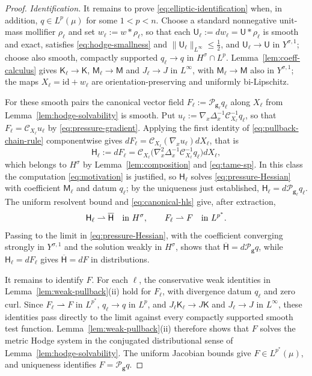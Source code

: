 \documentclass[11pt,reqno]{amsart}
\theoremstyle{plain}
\theoremstyle{definition}
\theoremstyle{remark}
\numberwithin{equation}{section}
\newcommand{\Ufield}{\mathsf U}
\newcommand{\Kmat}{\mathsf K}
\newcommand{\Mmat}{\mathsf M}
\newcommand{\Hess}{\mathsf H}     %
\newcommand{\gmetric}{\mathbf g}
\begin{document}
\begin{proof}
\emph{Identification.}
It remains to prove \eqref{eq:elliptic-identification} when, in addition,
$q\in L^p(\mu)$ for some $1<p<n$. Choose a standard nonnegative unit-mass
mollifier $\rho_\ell$ and set
$w_\ell:=w*\rho_\ell$, so that each $\Ufield_\ell:=dw_\ell=\Ufield*\rho_\ell$
is smooth and exact, satisfies \eqref{eq:hodge-smallness} and
$\|\Ufield_\ell\|_{L^\infty}\le\tfrac12$, and $\Ufield_\ell\to\Ufield$ in
$Y^{\sigma,1}$; choose also smooth, compactly supported $q_\ell\to q$ in
$H^\sigma\cap L^p$.  Lemma~\ref{lem:coeff-calculus} gives
$\Kmat_\ell\to\Kmat$, $\Mmat_\ell\to\Mmat$ and $J_\ell\to J$ in $L^\infty$,
with $\Mmat_\ell\to\Mmat$ also in $Y^{\sigma,1}$; the maps
$X_\ell=\mathrm{id}+w_\ell$ are orientation-preserving and uniformly
bi-Lipschitz.

For these smooth pairs the canonical vector field
$F_\ell:=\mathcal P_{\gmetric_\ell}q_\ell$ along $X_\ell$ from
Lemma~\ref{lem:hodge-solvability} is smooth.  Put
$u_\ell:=\nabla_x\Delta_x^{-1}\mathcal C_{X_\ell}^{-1}q_\ell$, so that
$F_\ell=\mathcal C_{X_\ell}u_\ell$ by \eqref{eq:pressure-gradient}.  Applying
the first identity of \eqref{eq:pullback-chain-rule} componentwise gives
$dF_\ell=\mathcal C_{X_\ell}(\nabla_xu_\ell) dX_\ell$, that is
\[
 \Hess_\ell:=dF_\ell
 =\mathcal C_{X_\ell}\big(\nabla_x^2\Delta_x^{-1}\mathcal C_{X_\ell}^{-1}q_\ell\big) dX_\ell ,
\]
which belongs to $H^\sigma$ by Lemma~\ref{lem:composition} and
\eqref{eq:tame-sp}.
In this class the computation \eqref{eq:motivation} is justified, so
$\Hess_\ell$ solves \eqref{eq:pressure-Hessian} with coefficient $\Mmat_\ell$
and datum $q_\ell$; by the uniqueness just established,
$\Hess_\ell=d\mathcal P_{\gmetric_\ell}q_\ell$.  The uniform resolvent bound
and \eqref{eq:canonical-hls} give, after extraction,
\[
 \Hess_\ell\rightharpoonup \overline{\Hess}\quad\hbox{in }H^\sigma,
 \qquad
 F_\ell\rightharpoonup F\quad\hbox{in }L^{p^*} .
\]
Passing to the limit in \eqref{eq:pressure-Hessian}, with the coefficient
converging strongly in $Y^{\sigma,1}$ and the solution weakly in $H^\sigma$,
shows that $\overline{\Hess}=d\mathcal P_{\gmetric}q$, while
$\Hess_\ell=dF_\ell$ gives $\overline{\Hess}=dF$ in distributions.

It remains to identify $F$. For each $\ell$, the conservative weak identities
in Lemma~\ref{lem:weak-pullback}(ii) hold for $F_\ell$, with divergence datum
$q_\ell$ and zero curl. Since $F_\ell\rightharpoonup F$ in $L^{p^*}$,
$q_\ell\to q$ in $L^p$, and $J_\ell\Kmat_\ell\to J\Kmat$ and
$J_\ell\to J$ in $L^\infty$, these identities pass directly to the limit
against every compactly supported smooth test function.
Lemma~\ref{lem:weak-pullback}(ii) therefore shows that $F$ solves the metric
Hodge system in the conjugated distributional sense of
Lemma~\ref{lem:hodge-solvability}. The uniform Jacobian bounds give
$F\in L^{p^*}(\mu)$, and uniqueness identifies $F=\mathcal P_{\gmetric}q$.
\end{proof}
\end{document}
